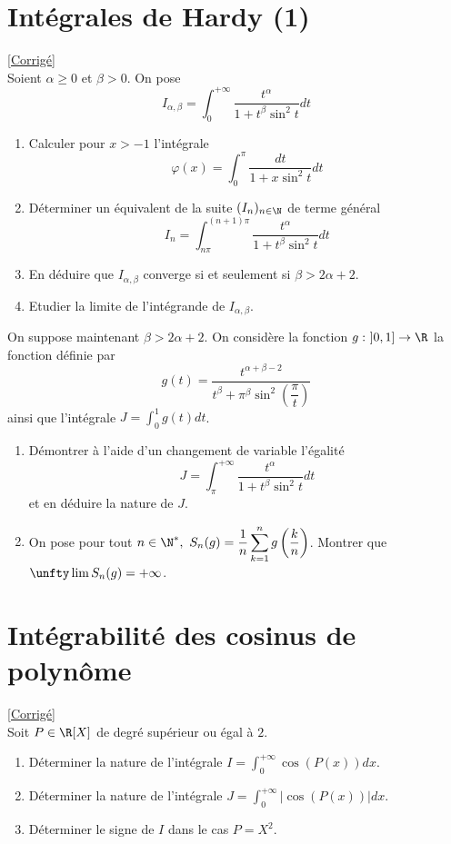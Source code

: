 \documentclass{book}
\begin{document}
	\section{Intégrales de Hardy (1)}
	\textcolor{blue}{\hyperref[Intégrales de Hardy (1) corrigé]{[Corrigé]}}\\
	\label{Intégrales de Hardy (1)}
	Soient $\alpha\geq 0$ et $\beta>0$. On pose
	$$I_{\alpha,\beta}=\int_0^{+\infty}\frac{t^\alpha}{1+t^\beta\sin^2t}dt$$
	\begin{enumerate}
		\item Calculer pour $x>-1$ l'intégrale
		$$\varphi(x)=\int_0^\pi\frac{dt}{1+x\sin^2t}dt$$
		\item Déterminer un équivalent de la suite $(I_n)_{n\in \N}$ de terme général
		$$I_n=\int_{n\pi}^{(n+1)\pi}\frac{t^\alpha}{1+t^\beta\sin^2t}dt$$
		\item En déduire que $I_{\alpha,\beta}$ converge si et seulement si $\beta>2\alpha+2$.
		\item Etudier la limite de l'intégrande de $I_{\alpha,\beta}$.
	\end{enumerate}
	On suppose maintenant $\beta>2\alpha+2$. On considère la fonction $g:\ ]0,1]\to \R$ la fonction définie par
	$$g(t)=\dfrac{t^{\alpha+\beta-2}}{t^\beta+\pi^\beta\sin^2\left(\dfrac{\pi}{t}\right)}$$
	ainsi que l'intégrale $J=\displaystyle\int_0^1g(t)dt$.
	\begin{enumerate}[resume]
		\item Démontrer à l'aide d'un changement de variable l'égalité
		$$J=\int_\pi^{+\infty}\frac{t^\alpha}{1+t^\beta\sin^2t}dt$$
		et en déduire la nature de $J$.
		\item On pose pour tout $n\in \N^*,\ S_n(g)=\displaystyle\frac{1}{n}\sum_{k=1}^ng\left(\frac{k}{n}\right)$. Montrer que $\unfty\lim S_n(g)=+\infty$.
	\end{enumerate}
	
	\section{Intégrabilité des cosinus de polynôme}
	\textcolor{blue}{\hyperref[Intégrabilité des cosinus de polynômes corrigé]{[Corrigé]}}\\
	\label{Intégrabilité des cosinus de polynôme}
	Soit $P\in \R[X]$ de degré supérieur ou égal à $2$.
	\begin{enumerate}
		\item Déterminer la nature de l'intégrale $I=\displaystyle\int_0^{+\infty}\cos(P(x))dx$.
		\item Déterminer la nature de l'intégrale $J=\displaystyle\int_0^{+\infty}|\cos(P(x))|dx$.
		\item Déterminer le signe de $I$ dans le cas $P=X^2$.
	\end{enumerate}
	
\end{document}
